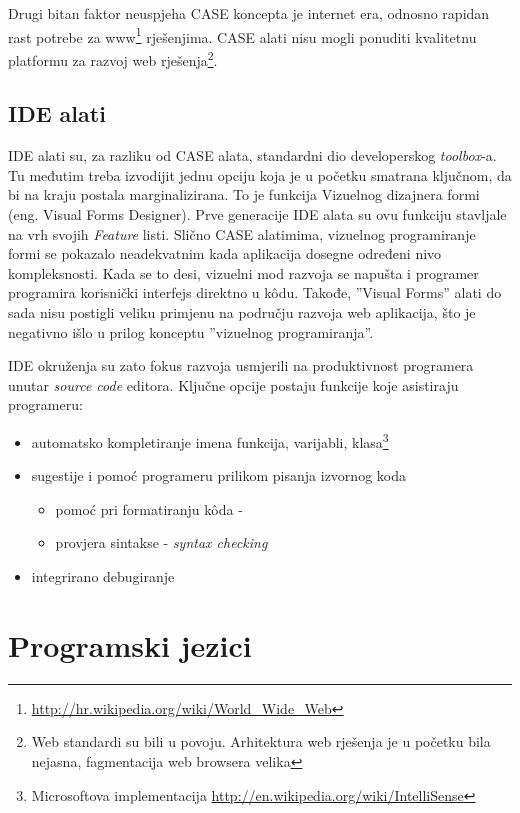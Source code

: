 \documentclass[times, utf8, seminar]{fit}
\begin{document}
Drugi bitan faktor neuspjeha CASE koncepta je internet era, odnosno rapidan rast potrebe za www\footnote{\url{http://hr.wikipedia.org/wiki/World_Wide_Web}} rješenjima. CASE alati nisu mogli ponuditi kvalitetnu platformu za razvoj web rješenja\footnote{Web standardi su bili u povoju. Arhitektura web rješenja je u početku bila nejasna, fagmentacija web browsera velika}.

\subsection{IDE alati}

IDE alati su, za razliku od CASE alata, standardni dio developerskog \emph{toolbox}-a. Tu međutim treba izvodijit jednu opciju koja je u početku smatrana ključnom, da bi na kraju postala marginalizirana. To je funkcija Vizuelnog dizajnera formi (eng. Visual Forms Designer). Prve generacije IDE alata su ovu funkciju stavljale na vrh svojih \emph{Feature} listi. Slično CASE alatimima,  vizuelnog programiranje formi se pokazalo neadekvatnim kada aplikacija dosegne određeni nivo kompleksnosti. Kada se to desi, vizuelni mod razvoja se napušta i programer programira korisnički interfejs direktno u k\^odu. Takođe, ''Visual Forms'' alati do sada nisu postigli veliku primjenu na području razvoja web aplikacija, što je negativno išlo u prilog konceptu ''vizuelnog programiranja''. 

IDE okruženja su zato fokus razvoja usmjerili na produktivnost programera unutar \emph{source code} editora. Ključne opcije postaju funkcije koje asistiraju programeru:
\begin{itemize}
  \item automatsko kompletiranje imena funkcija, varijabli, klasa\footnote{Microsoftova implementacija \url{http://en.wikipedia.org/wiki/IntelliSense}}
  \item sugestije i pomoć programeru prilikom pisanja izvornog koda 
     \begin{itemize}
        \item pomoć pri formatiranju k\^oda - 
        \item provjera sintakse - \emph{syntax checking}
      \end{itemize}
  \item integrirano debugiranje
\end{itemize}

\section{Programski jezici}
\end{document}
